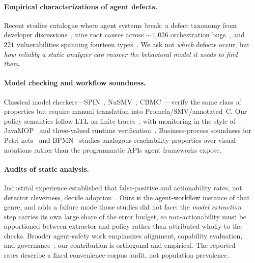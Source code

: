 \paragraph{Empirical characterizations of agent defects.}
Recent studies catalogue where agent systems break: a defect taxonomy from
developer discussions~\citep{ning2024agentable}, nine root causes across
${\sim}1{,}026$ orchestration bugs~\citep{xue2025bugs}, and $221$ vulnerabilities
spanning fourteen types~\citep{shen2025securitydebt}. We ask not \emph{which}
defects occur, but \emph{how reliably a static analyzer can recover the
behavioral model it needs to find them}.


\paragraph{Model checking and workflow soundness.}
Classical model checkers---SPIN~\citep{holzmann1997spin},
NuSMV~\citep{cimatti2002nusmv}, CBMC~\citep{cbmc}---verify the same class of
properties but require manual translation into Promela/SMV/annotated~C. Our
policy semantics follow LTL on finite traces~\citep{degiacomo2013ltlf}, with
monitoring in the style of JavaMOP~\citep{javamop} and three-valued runtime
verification~\citep{bauer2011ltl3}. Business-process soundness for Petri
nets~\citep{vanderaalst2011bpm} and BPMN~\citep{dijkman2008bpmn} studies
analogous reachability properties over visual notations rather than the
programmatic APIs agent frameworks expose.

\paragraph{Audits of static analysis.}
Industrial experience established that false-positive and actionability rates,
not detector cleverness, decide adoption~\citep{bessey2010coverity,
johnson2013static, sadowski2018lessons}. Ours is the agent-workflow instance of
that genre, and adds a failure mode those studies did not face: the \emph{model
extraction} step carries its own large share of the error budget, so
non-actionability must be apportioned between extractor and policy rather than
attributed wholly to the checks. Broader agent-safety work emphasizes alignment,
capability evaluation, and governance~\citep{anthropic_rsp, metr,
gabriel2024ethics}; our contribution is orthogonal and empirical. The reported
rates describe a fixed convenience-corpus audit, not population prevalence.
